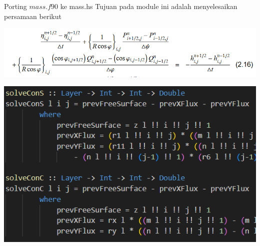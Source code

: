 \documentclass{beamer}
\begin{document}
\begin{frame}{Porting $mass.f90$ ke mass.hs}
    Tujuan pada module ini adalah menyelesaikan persamaan berikut
    \begin{center}
        \includegraphics[scale=0.4]{figure/mass.png}
    \end{center}
    \begin{center}
        \includegraphics[scale=0.5]{figure/mass4.png}
    \end{center}
\end{frame}
\end{document}

